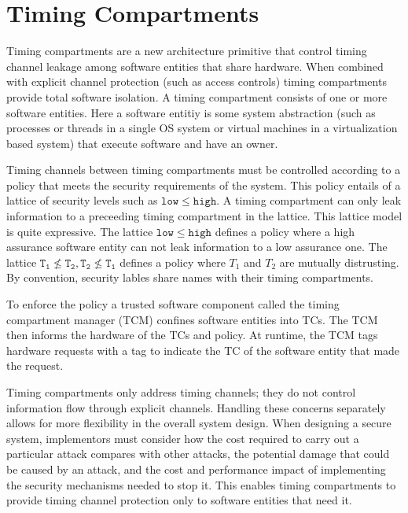 \section{Timing Compartments}
    Timing compartments are a new architecture primitive that control timing 
    channel leakage among software entities that share hardware. When combined 
    with explicit channel protection (such as access controls) timing 
    compartments provide total software isolation.
    A timing compartment consists of one or more software entities. Here a 
    software entitiy is some system abstraction (such as processes or threads 
    in a single OS system or virtual machines in a virtualization based system) 
    that execute software and have an owner.
    
    Timing channels between timing compartments must be controlled according to 
    a policy that meets the security requirements of the system. This policy 
    entails of a lattice of security levels such as $\mathtt{low} \leq
    \mathtt{high}$. A timing compartment can only leak information to a 
    preceeding timing compartment in the lattice. This lattice model is quite 
    expressive. The lattice $\mathtt{low} \leq \mathtt{high}$ defines a policy 
    where a high assurance software entity can not leak information to a low 
    assurance one. The lattice $\mathtt{T_1} \nleq \mathtt{T_2}, \mathtt{T_2} 
    \nleq \mathtt{T_1}$ defines a policy where $T_1$ and $T_2$ are mutually 
    distrusting. By convention, security lables share names with their timing 
    compartments. 
 
    To enforce the policy a trusted software component called the timing 
    compartment manager (TCM) confines software entities into TCs. The TCM then 
    informs the hardware of the TCs and policy. At runtime, the TCM tags 
    hardware requests with a tag to indicate the TC of the software entity that 
    made the request. 

    Timing compartments only address timing channels; they do not control 
    information flow through explicit channels. Handling these concerns 
    separately allows for more flexibility in the overall system design.  When 
    designing a secure system, implementors must consider how the cost required 
    to carry out a particular attack compares with other attacks, the potential 
    damage that could be caused by an attack, and the cost and performance 
    impact of implementing the security mechanisms needed to stop it. This 
    enables timing compartments to provide timing channel protection only to 
    software entities that need it.

